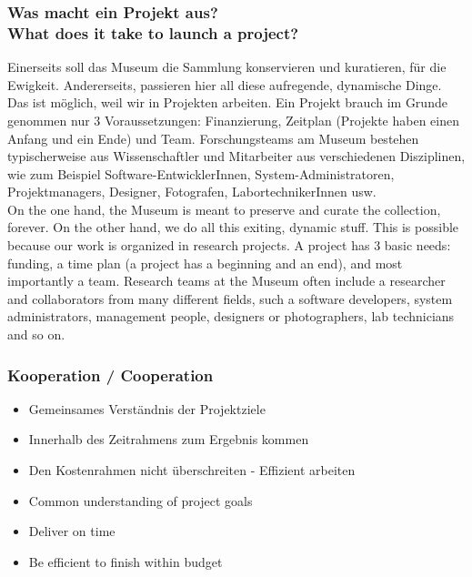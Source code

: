 {\scriptsize
\begin{frame}
  \frametitle{Was macht ein Projekt aus? \\ \textcolor{mfn_green}{What does it take to launch a project?}}
  Einerseits soll das Museum die Sammlung konservieren und kuratieren, für die Ewigkeit. Andererseits, passieren hier all diese aufregende, dynamische Dinge. Das ist möglich, weil wir in Projekten arbeiten. Ein Projekt brauch im Grunde genommen nur 3 Voraussetzungen: Finanzierung, Zeitplan (Projekte haben einen Anfang und ein Ende) und Team. Forschungsteams am Museum bestehen typischerweise aus Wissenschaftler und Mitarbeiter aus verschiedenen Disziplinen, wie zum Beispiel Software-EntwicklerInnen, System-Administratoren, Projektmanagers, Designer, Fotografen, LabortechnikerInnen usw.\\
  \bigskip
  \textcolor{mfn_green}{On the one hand, the Museum is meant to preserve and curate the collection, forever. On the other hand, we do all this exiting, dynamic stuff. This is possible because our work is organized in research projects. A project has 3 basic needs: funding, a time plan (a project has a beginning and an end), and most importantly a team. Research teams at the Museum often include a researcher and collaborators from many different fields, such a software developers, system administrators, management people, designers or photographers, lab technicians and so on.}
\end{frame}
}
\begin{frame}
  \frametitle{Kooperation / \textcolor{mfn_green}{Cooperation}}

  \begin{itemize}
  \item{Gemeinsames Verständnis der Projektziele}
  \item{Innerhalb des Zeitrahmens zum Ergebnis kommen}
  \item{Den Kostenrahmen nicht überschreiten - Effizient arbeiten}
  \end{itemize}
  
  \begin{itemize}
  \item{\textcolor{mfn_green}{Common understanding of project goals}}
  \item{\textcolor{mfn_green}{Deliver on time}}
  \item{\textcolor{mfn_green}{Be efficient to finish within budget}}
  \end{itemize}
\end{frame}

